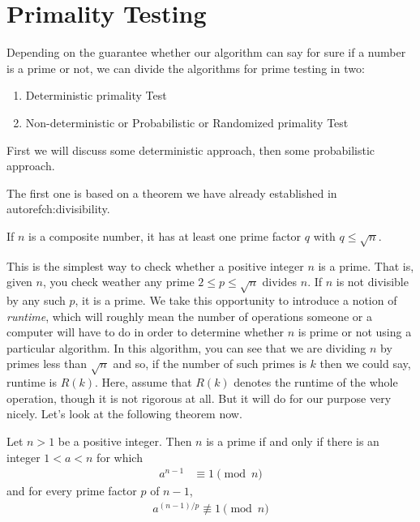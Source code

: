 \section{Primality Testing}\label{sec:primalitytesting}
Depending on the guarantee whether our algorithm can say for sure if a number is a prime or not, we can divide the algorithms for prime testing in two:
	\begin{enumerate}
		\item Deterministic primality Test
		\item Non-deterministic or Probabilistic or Randomized primality Test
	\end{enumerate}
First we will discuss some deterministic approach, then some probabilistic approach.

The first one is based on a theorem we have already established in autoref{ch:divisibility}.
	\begin{theorem} \label{thm:trialdivision}
		If $n$ is a composite number, it has at least one prime factor $q$ with $q\leq\sqrt{n}$.
	\end{theorem}
This is the simplest way to check whether a positive integer $n$ is a prime. That is, given $n$, you check weather any prime $2 \leq p \leq \sqrt n$ divides $n$. If $n$ is not divisible by any such $p$, it is a prime. We take this opportunity to introduce a notion of \textit{runtime}, which will roughly mean the number of operations someone or a computer will have to do in order to determine whether $n$ is prime or not using a particular algorithm. In this algorithm, you can see that we are dividing $n$ by primes less than $\sqrt{n}$ and so, if the number of such primes is $k$ then we could say, runtime is $R(k)$. Here, assume that $R(k)$ denotes the runtime of the whole operation, though it is not rigorous at all. But it will do for our purpose very nicely. Let's look at the following theorem now.
	\begin{theorem}
		\label{thm:lucastest}
		Let $n >1$ be a positive integer. Then $n$ is a prime if and only if there is an integer $1<a<n$ for which
			\begin{align*}
				a^{n-1} &\equiv1\pmod n
			\end{align*}
		and for every prime factor $p$ of $n-1$,
			\begin{align*}
				a^{(n-1)/p} \not \equiv 1 \pmod n
			\end{align*}
	\end{theorem}


